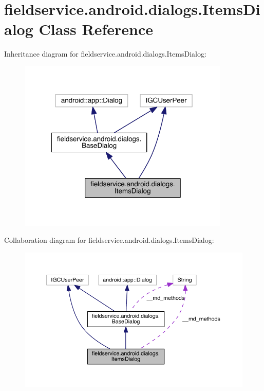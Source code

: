 \hypertarget{classfieldservice_1_1android_1_1dialogs_1_1_items_dialog}{\section{fieldservice.\+android.\+dialogs.\+Items\+Dialog Class Reference}
\label{classfieldservice_1_1android_1_1dialogs_1_1_items_dialog}
}


Inheritance diagram for fieldservice.\+android.\+dialogs.\+Items\+Dialog\+:
\nopagebreak
\begin{figure}[H]
\begin{center}
\leavevmode
\includegraphics[width=286pt]{classfieldservice_1_1android_1_1dialogs_1_1_items_dialog__inherit__graph}
\end{center}
\end{figure}


Collaboration diagram for fieldservice.\+android.\+dialogs.\+Items\+Dialog\+:
\nopagebreak
\begin{figure}[H]
\begin{center}
\leavevmode
\includegraphics[width=350pt]{classfieldservice_1_1android_1_1dialogs_1_1_items_dialog__coll__graph}
\end{center}
\end{figure}
